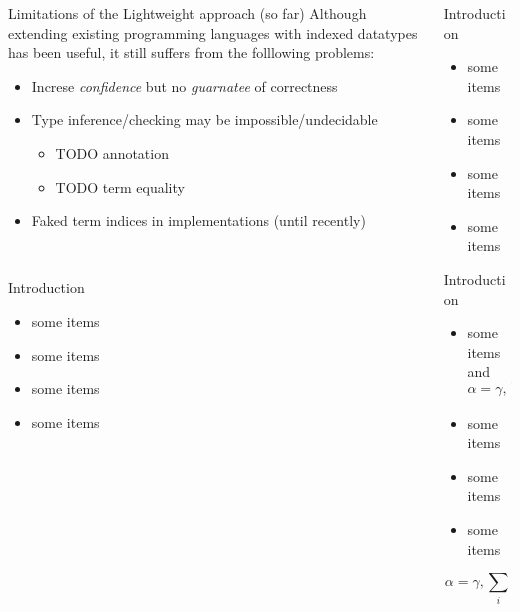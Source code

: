 \documentclass[final]{beamer}
\begin{document}
\begin{frame}[fragile]
\begin{columns}[t]
\begin{column}{.315\linewidth}
\begin{block}{Limitations of the Lightweight approach {\normalsize(so far)}}
Although extending existing programming languages with indexed datatypes
has been useful, it still suffers from the folllowing problems:
\begin{itemize}
\item Increse \emph{confidence} but no \emph{guarnatee} of correctness
\item Type inference/checking may be impossible/undecidable
	\begin{itemize}
		\item TODO annotation
		\item TODO term equality
	\end{itemize}
\item Faked term indices in implementations (until recently)
\end{itemize}
~
\end{block}

\begin{block}{Introduction}
\begin{itemize}
\item some items
\item some items
\item some items
\item some items
\end{itemize}
\end{block}



\end{column}
\begin{column}{.315\linewidth}
\begin{block}{Introduction}
\begin{itemize}
\item some items
\item some items
\item some items
\item some items
\end{itemize}
\end{block}

\begin{block}{Introduction}
\begin{itemize}
\item some items and $\alpha=\gamma, \sum_{i}$
\item some items
\item some items
\item some items
\end{itemize}
$$\alpha=\gamma, \sum_{i}$$
\end{block}

\end{column}
\end{columns}

\end{frame}
\end{document}
